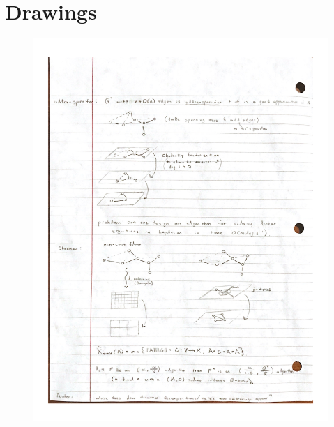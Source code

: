 \documentclass[11pt]{article}
\begin{document}
\section{Drawings}
\begin{figure}
  \centering
  \includegraphics[width=1.0\textwidth]{../assets/drawing}
\end{figure}
\end{document}
